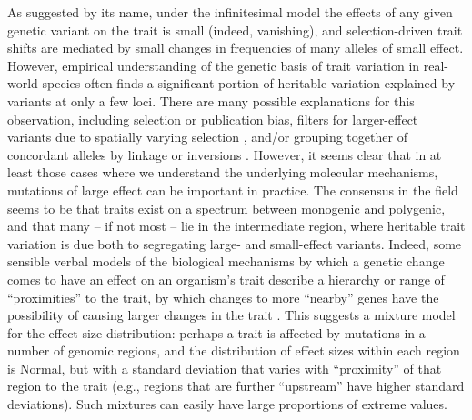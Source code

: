 \documentclass{article}
\newcommand{\1}{\mathbbm{1}}
\theoremstyle{remark}
\theoremstyle{definition}
\begin{document}
As suggested by its name,
under the infinitesimal model the effects of any given genetic variant on the trait
is small (indeed, vanishing),
and selection-driven trait shifts are mediated by small changes in frequencies of many alleles of small effect.
However, empirical understanding of the genetic basis of trait variation in real-world species
often finds a significant portion of heritable variation explained by variants at only a few loci.
There are many possible explanations for this observation,
including selection or publication bias,
filters for larger-effect variants due to spatially varying selection
\citep{barton1987establishment,yeaman2011establishment,yeaman2011genetic},
and/or grouping together of concordant alleles by linkage or inversions
\citep{kirkpatrick2006chromosome}.
However,
it seems clear that in at least those cases where we understand the underlying molecular mechanisms,
mutations of large effect can be important in practice.
The consensus in the field seems to be that traits exist on a spectrum between monogenic and polygenic,
and that many -- if not most -- lie in the intermediate region,
where heritable trait variation is due both to segregating large- and small-effect variants.
Indeed, some sensible verbal models of the biological mechanisms by which a genetic change
comes to have an effect on an organism's trait
describe a hierarchy or range of ``proximities'' to the trait,
by which changes to more ``nearby'' genes have the possibility of causing larger changes in the trait
\citep{kopp2012transcriptional,boyle2017expanded}.
This suggests a mixture model for the effect size distribution:
perhaps a trait is affected by mutations in a number of genomic regions,
and the distribution of effect sizes within each region is Normal, 
but with a standard deviation that varies with ``proximity'' of that region to the trait
(e.g., regions that are further ``upstream'' have higher standard deviations).
Such mixtures can easily have large proportions of extreme values.
\end{document}
